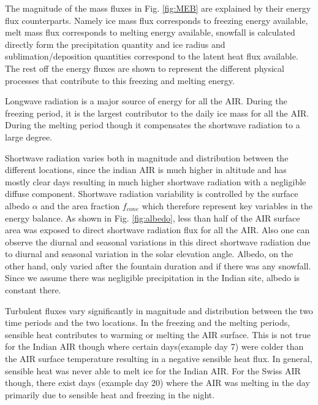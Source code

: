 \documentclass[utf8]{frontiersSCNS} %
\begin{document}
The magnitude of the mass fluxes in Fig. \ref{fig:MEB} are explained by their energy flux counterparts. Namely ice mass
flux corresponds to freezing energy available, melt mass flux corresponds to melting energy available, snowfall is
calculated directly form the precipitation quantity and ice radius and sublimation/deposition quantities correspond to
the latent heat flux available. The rest off the energy fluxes are shown to represent the different physical processes
that contribute to this freezing and melting energy.

Longwave radiation is a major source of energy for all the AIR. During the freezing period, it is the largest
contributor to the daily ice mass for all the AIR. During the melting period though it compensates the shortwave
radiation to a large degree.

Shortwave radiation varies both in magnitude and distribution between the different locations, since the indian AIR is
much higher in altitude and has mostly clear days resulting in much higher shortwave radiation with a negligible
diffuse component.  Shortwave radiation variability is controlled by the surface albedo $\alpha$ and the area
fraction $f_{cone}$ which therefore represent key variables in the energy balance. As shown in Fig. \ref{fig:albedo},
less than half of the AIR surface area was exposed to direct shortwave radiation flux for all the AIR. Also one can
observe the diurnal and seasonal variations in this direct shortwave radiation due to diurnal and seasonal variation in
the solar elevation angle.  Albedo, on the other hand, only varied after the fountain duration and if there was any
snowfall. Since we assume there was negligible precipitation in the Indian site, albedo is constant there.

Turbulent fluxes vary significantly in magnitude and distribution between the two time periods and the two locations.
In the freezing and the melting periods, sensible heat contributes to warming or melting the AIR surface. This is not
true for the Indian AIR though where certain days(example day 7) were colder than the AIR surface temperature resulting
in a negative sensible heat flux. In general, sensible heat was never able to melt ice for the Indian AIR. For the Swiss
AIR though, there exist days (example day 20) where the AIR was melting in the day primarily due to sensible heat and
freezing in the night.
\end{document}

